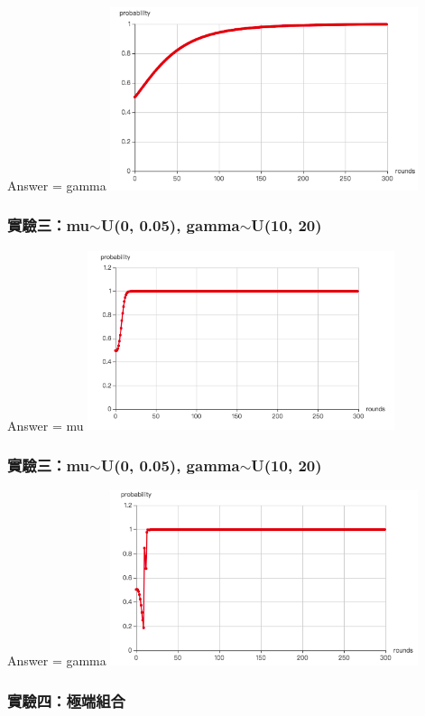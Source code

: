 \documentclass[12pt,a4paper]{beamer}
\begin{document}
\begin{CJK}{UTF8}{bsmi}
\begin{frame}
Answer = gamma
\centering\includegraphics[width=90mm,scale=0.7]{exp2-2}

\end{frame}

\begin{frame}
\frametitle{實驗三：mu$\sim$U(0, 0.05), gamma$\sim$U(10, 20)}

Answer = mu
\centering\includegraphics[width=90mm,scale=0.7]{exp3-1}

\end{frame}

\begin{frame}
\frametitle{實驗三：mu$\sim$U(0, 0.05), gamma$\sim$U(10, 20)}

Answer = gamma
\centering\includegraphics[width=90mm,scale=0.7]{exp3-2}

\end{frame}

\begin{frame}
\frametitle{實驗四：極端組合}


\end{frame}
\end{CJK}
\end{document}
